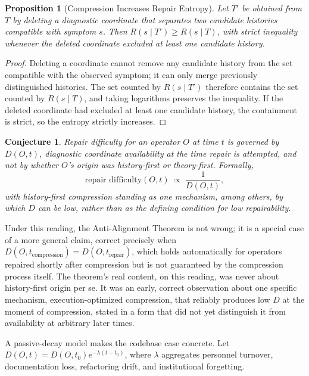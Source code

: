 \documentclass[11pt]{article}
\newtheorem{proposition}{Proposition}[section]
\newtheorem{conjecture}{Conjecture}[section]
\begin{document}
\begin{proposition}[Compression Increases Repair Entropy]
Let $T'$ be obtained from $T$ by deleting a diagnostic coordinate that separates two candidate histories compatible with symptom $s$. Then $R(s \mid T') \geq R(s \mid T)$, with strict inequality whenever the deleted coordinate excluded at least one candidate history.
\end{proposition}

\begin{proof}
Deleting a coordinate cannot remove any candidate history from the set compatible with the observed symptom; it can only merge previously distinguished histories. The set counted by $R(s \mid T')$ therefore contains the set counted by $R(s \mid T)$, and taking logarithms preserves the inequality. If the deleted coordinate had excluded at least one candidate history, the containment is strict, so the entropy strictly increases.
\end{proof}

\begin{conjecture}
Repair difficulty for an operator $O$ at time $t$ is governed by $D(O,t)$, diagnostic coordinate availability at the time repair is attempted, and not by whether $O$'s origin was history-first or theory-first. Formally,
\[
\text{repair difficulty}(O,t) \; \propto \; \frac{1}{D(O,t)},
\]
with history-first compression standing as one mechanism, among others, by which $D$ can be low, rather than as the defining condition for low repairability.
\end{conjecture}

Under this reading, the Anti-Alignment Theorem is not wrong; it is a special case of a more general claim, correct precisely when $D(O, t_{\text{compression}}) = D(O, t_{\text{repair}})$, which holds automatically for operators repaired shortly after compression but is not guaranteed by the compression process itself. The theorem's real content, on this reading, was never about history-first origin per se. It was an early, correct observation about one specific mechanism, execution-optimized compression, that reliably produces low $D$ at the moment of compression, stated in a form that did not yet distinguish it from availability at arbitrary later times.

A passive-decay model makes the codebase case concrete. Let $D(O,t) = D(O,t_0) e^{-\lambda(t - t_0)}$, where $\lambda$ aggregates personnel turnover, documentation loss, refactoring drift, and institutional forgetting.
\end{document}
